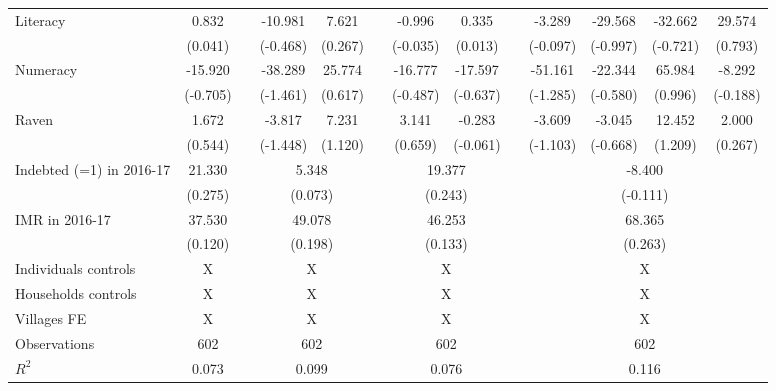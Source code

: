 \begin{table}[htbp]
{\begin{tabular}{lcccccccccccc}
    Literacy & 0.832 &       & -10.981 & 7.621 &       & -0.996 & 0.335 &       & -3.289 & -29.568 & -32.662 & 29.574 \\
          & (0.041) &       & (-0.468) & (0.267) &       & (-0.035) & (0.013) &       & (-0.097) & (-0.997) & (-0.721) & (0.793) \\
    Numeracy & -15.920 &       & -38.289 & 25.774 &       & -16.777 & -17.597 &       & -51.161 & -22.344 & 65.984 & -8.292 \\
          & (-0.705) &       & (-1.461) & (0.617) &       & (-0.487) & (-0.637) &       & (-1.285) & (-0.580) & (0.996) & (-0.188) \\
    Raven & 1.672 &       & -3.817 & 7.231 &       & 3.141 & -0.283 &       & -3.609 & -3.045 & 12.452 & 2.000 \\
          & (0.544) &       & (-1.448) & (1.120) &       & (0.659) & (-0.061) &       & (-1.103) & (-0.668) & (1.209) & (0.267) \\
\cmidrule{1-2}\cmidrule{4-5}\cmidrule{7-8}\cmidrule{10-13}    Indebted (=1) in 2016-17 & 21.330 &       & \multicolumn{2}{c}{5.348} &       & \multicolumn{2}{c}{19.377} &       & \multicolumn{4}{c}{-8.400} \\
          & (0.275) &       & \multicolumn{2}{c}{(0.073)} &       & \multicolumn{2}{c}{(0.243)} &       & \multicolumn{4}{c}{(-0.111)} \\
    IMR in 2016-17 & 37.530 &       & \multicolumn{2}{c}{49.078} &       & \multicolumn{2}{c}{46.253} &       & \multicolumn{4}{c}{68.365} \\
          & (0.120) &       & \multicolumn{2}{c}{(0.198)} &       & \multicolumn{2}{c}{(0.133)} &       & \multicolumn{4}{c}{(0.263)} \\
    Individuals controls & X     &       & \multicolumn{2}{c}{X} &       & \multicolumn{2}{c}{X} &       & \multicolumn{4}{c}{X} \\
    Households controls & X     &       & \multicolumn{2}{c}{X} &       & \multicolumn{2}{c}{X} &       & \multicolumn{4}{c}{X} \\
    Villages FE & X     &       & \multicolumn{2}{c}{X} &       & \multicolumn{2}{c}{X} &       & \multicolumn{4}{c}{X} \\
    \midrule
    Observations & 602   &       & \multicolumn{2}{c}{602} &       & \multicolumn{2}{c}{602} &       & \multicolumn{4}{c}{602} \\
    $R^2$ & 0.073 &       & \multicolumn{2}{c}{0.099} &       & \multicolumn{2}{c}{0.076} &       & \multicolumn{4}{c}{0.116} \\

\end{tabular}}
\end{table}

